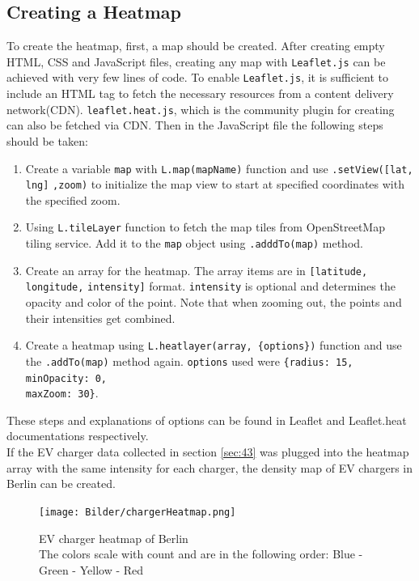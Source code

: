 \subsection{Creating a Heatmap}\label{sec:51}
To create the heatmap, first, a map should be created. After creating empty HTML, CSS and JavaScript files, creating any map with \verb|Leaflet.js| can be achieved with very few lines of code. To enable \verb|Leaflet.js|, it is sufficient to include an HTML tag to fetch the necessary resources from a content delivery network(CDN). \verb|leaflet.heat.js|, which is the community plugin for creating can also be fetched via \gls{CDN}. Then in the JavaScript file the following steps should be taken:
\begin{enumerate}
    \item Create a variable \verb|map| with \verb|L.map(mapName)| function and use \verb|.setView([lat, lng]| \verb|,zoom)| to initialize the map view to start at specified coordinates with the specified zoom.
    \item Using \verb|L.tileLayer| function to fetch the map tiles from OpenStreetMap tiling service. Add it to the \verb|map| object using \verb|.adddTo(map)| method.
    \item Create an array for the heatmap. The array items are in \verb|[latitude, longitude,| \verb|intensity]| format. \verb|intensity| is optional and determines the opacity and color of the point. Note that when zooming out, the points and their intensities get combined.
    \item Create a heatmap using \verb|L.heatlayer(array, {options})| function and use the \verb|.addTo(map)| method again. \verb|options| used were \verb|{radius: 15, minOpacity: 0,|\\\verb|maxZoom: 30}|.
\end{enumerate}
These steps and explanations of options can be found in Leaflet\cite{leafletdocs} and Leaflet.heat\cite{leafletheatdocs} documentations respectively.\\
If the EV charger data collected in section \ref{sec:43} was plugged into the heatmap array with the same intensity for each charger, the density map of EV chargers in Berlin can be created.
\begin{figure}[hbt!]
\begin{center}
\texttt{[image: Bilder/chargerHeatmap.png]}
\caption{EV charger heatmap of Berlin\\
          The colors scale with count and are in the following order: Blue - Green - Yellow - Red}\label{fig:chargerdensity}
\end{center}
\end{figure}

